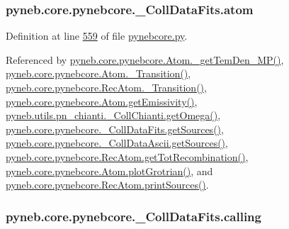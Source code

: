 \hypertarget{classpyneb_1_1core_1_1pynebcore_1_1___coll_data_fits_a8bbd2e846954f94878e90ebdf0e51772}{}
\subsubsection[{atom}]{\setlength{\rightskip}{0pt plus 5cm}pyneb.\+core.\+pynebcore.\+\_\+\+Coll\+Data\+Fits.\+atom}\label{classpyneb_1_1core_1_1pynebcore_1_1___coll_data_fits_a8bbd2e846954f94878e90ebdf0e51772}


Definition at line \hyperlink{pynebcore_8py_source_l00559}{559} of file \hyperlink{pynebcore_8py_source}{pynebcore.\+py}.



Referenced by \hyperlink{pynebcore_8py_source_l01980}{pyneb.\+core.\+pynebcore.\+Atom.\+\_\+get\+Tem\+Den\+\_\+\+M\+P()}, \hyperlink{pynebcore_8py_source_l01367}{pyneb.\+core.\+pynebcore.\+Atom.\+\_\+\+Transition()}, \hyperlink{pynebcore_8py_source_l02696}{pyneb.\+core.\+pynebcore.\+Rec\+Atom.\+\_\+\+Transition()}, \hyperlink{pynebcore_8py_source_l01716}{pyneb.\+core.\+pynebcore.\+Atom.\+get\+Emissivity()}, \hyperlink{pn__chianti_8py_source_l00484}{pyneb.\+utils.\+pn\+\_\+chianti.\+\_\+\+Coll\+Chianti.\+get\+Omega()}, \hyperlink{pynebcore_8py_source_l00673}{pyneb.\+core.\+pynebcore.\+\_\+\+Coll\+Data\+Fits.\+get\+Sources()}, \hyperlink{pynebcore_8py_source_l01003}{pyneb.\+core.\+pynebcore.\+\_\+\+Coll\+Data\+Ascii.\+get\+Sources()}, \hyperlink{pynebcore_8py_source_l02735}{pyneb.\+core.\+pynebcore.\+Rec\+Atom.\+get\+Tot\+Recombination()}, \hyperlink{pynebcore_8py_source_l02372}{pyneb.\+core.\+pynebcore.\+Atom.\+plot\+Grotrian()}, and \hyperlink{pynebcore_8py_source_l02796}{pyneb.\+core.\+pynebcore.\+Rec\+Atom.\+print\+Sources()}.

\hypertarget{classpyneb_1_1core_1_1pynebcore_1_1___coll_data_fits_a43c9d096f9508cb475cb4fc3552e1979}{}
\subsubsection[{calling}]{\setlength{\rightskip}{0pt plus 5cm}pyneb.\+core.\+pynebcore.\+\_\+\+Coll\+Data\+Fits.\+calling}\label{classpyneb_1_1core_1_1pynebcore_1_1___coll_data_fits_a43c9d096f9508cb475cb4fc3552e1979}


